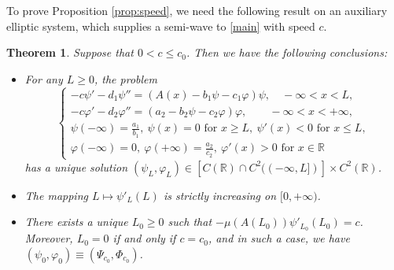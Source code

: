 \documentclass[reqno]{amsart}
\theoremstyle{plain}
\newtheorem{theorem}{Theorem}
\theoremstyle{definition}
\theoremstyle{remark}
\begin{document}
	To prove Proposition \ref{prop:speed}, we need the following result on an auxiliary elliptic system, which supplies a semi-wave to \eqref{main} with speed $c$.
	\begin{theorem}\label{th:semi-wave} Suppose that $0<c\le c_0$. Then we have the following conclusions:
		\begin{itemize}
			\item[(i)] For any $L\ge0$, the problem
			\begin{equation}\label{semi-wave}
				\begin{cases}
					-c \psi' - d_1 \psi'' = (A(x) - b_1\psi - c_1\varphi)\psi, \quad-\infty < x < L,\\
					-c \varphi' - d_2 \varphi'' = (a_2 - b_2\psi - c_2\varphi)\varphi, \qquad -\infty < x < +\infty,\\
					\psi(-\infty) = \frac{a_1}{b_1}, ~ \psi(x)=0 \text{ for } x\ge L, ~ \psi'(x)<0 \text{ for } x\le L,\\	
					\varphi(-\infty) = 0, ~ \varphi(+\infty)=\frac{a_2}{c_2}, ~ \varphi'(x)>0 \text{ for } x\in\mathbb{R}
				\end{cases}			
			\end{equation}
			has a unique solution $(\psi_L,\varphi_L) \in [C(\mathbb{R})\cap C^2((-\infty, L])] \times C^2(\mathbb{R})$.
			\item[(ii)] The mapping $L \mapsto \psi'_L(L)$ is strictly increasing on $[0, +\infty)$.
			\item[(iii)] There exists a unique $L_0 \geq 0$ such that $-\mu(A(L_0))\psi'_{L_0}(L_0) = c$. Moreover, $L_0 = 0$ if and only if $c = c_0$, and in such a case, we have $(\psi_0,\varphi_0) \equiv (\Psi_{c_0}, \Phi_{c_0})$.
		\end{itemize}
	\end{theorem}
	
\end{document}
